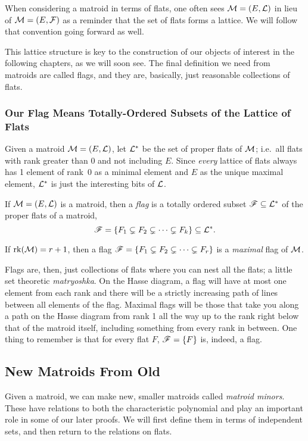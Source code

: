 \documentclass[12pt,oneside]{../../sfsuthesis}
\begin{document}
When considering a matroid in terms of flats, one often sees \( \mathcal{M} = (E, \mathcal{L}) \) in lieu of \( \mathcal{M} = (E, \mathcal{F}) \) as a reminder that the set of flats forms a lattice.
We will follow that convention going forward as well.

This lattice structure is key to the construction of our objects of interest in the following chapters, as we will soon see.
The final definition we need from matroids are called flags, and they are, basically, just reasonable collections of flats.

\subsubsection{Our Flag Means Totally-Ordered Subsets of the Lattice of Flats}

Given a matroid \( \mathcal{M} = (E, \mathcal{L}) \), let \( \mathcal{L}^\ast \) be the set of proper flats of \( \mathcal{M} \);
i.e.\ all flats with rank greater than 0 and not including \( E \).
Since \textit{every} lattice of flats always has 1 element of rank~0 as a minimal element and \( E \) as the unique maximal element, \( \mathcal{L}^\ast \) is just the interesting bits of \( \mathcal{L} \).

\begin{definition}[Flag]\label{def:flag}

    If \( \mathcal{M} = (E, \mathcal{L}) \) is a matroid, then a \emph{flag} is a totally ordered subset \( \mathscr{F} \subseteq \mathcal{L}^\ast \) of the proper flats of a matroid,
    \[
        \mathscr{F} = \{ F_1 \subsetneq F_2 \subsetneq \cdots \subsetneq F_k \} \subseteq \mathcal{L}^\ast.
    \]

    If \( \operatorname{rk}(\mathcal{M}) = r + 1 \), then a flag \( \mathscr{F} = \{ F_1 \subsetneq F_2 \subsetneq \cdots \subsetneq F_r \} \) is a \emph{maximal} flag of \( \mathcal{M} \).

\end{definition}

Flags are, then, just collections of flats where you can nest all the flats; a little set theoretic \textit{matryoshka}.
On the Hasse diagram, a flag will have at most one element from each rank and there will be a strictly increasing path of lines between all elements of the flag.
Maximal flags will be those that take you along a path on the Hasse diagram from rank 1 all the way up to the rank right below that of the matroid itself, including something from every rank in between.
One thing to remember is that for every flat \( F \), \( \mathscr{F} = \{ F \} \) is, indeed, a flag.

\subsection{New Matroids From Old}
Given a matroid, we can make new, smaller matroids called \emph{matroid minors}.
These have relations to both the characteristic polynomial and play an important role in some of our later proofs.
We will first define them in terms of independent sets, and then return to the relations on flats.
\end{document}
